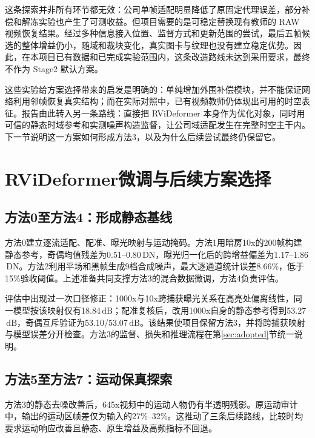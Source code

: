 \documentclass[11pt,a4paper,UTF8,fontset=fandol]{ctexart}
\newcommand{\dn}{\ensuremath{\,\mathrm{DN}}}
\newcommand{\db}{\ensuremath{\,\mathrm{dB}}}
\begin{document}
这条探索并非所有环节都无效：公司单帧适配明显降低了原固定代理误差，部分补偿和解冻实验也产生了可测收益。但项目需要的是可稳定替换现有教师的 RAW 视频恢复结果。经过多种信息接入位置、监督方式和更新范围的尝试，最后五帧候选的整体增益仍小，随域和裁块变化，真实图卡与纹理也没有建立稳定优势。因此，在本项目已有数据和已完成实验范围内，这条改造路线未达到采用要求，最终不作为 Stage2 默认方案。

这些实验给方案选择带来的启发是明确的：单纯增加外围补偿模块，并不能保证网络利用邻帧恢复真实结构；而在实际对照中，已有视频教师仍体现出可用的时空表征。报告由此转入另一条路线：直接把 RViDeformer 本身作为优化对象，同时用可信的静态时域参考和实测噪声构造监督，让公司域适配发生在完整时空主干内。下一节说明这一方案如何形成方法3，以及为什么后续尝试最终仍保留它。

\section{RViDeformer微调与后续方案选择}
\label{sec:exploration}

\subsection{方法0至方法4：形成静态基线}

方法0建立逐流适配、配准、曝光映射与运动掩码。方法1用暗房10x的200帧构建静态参考，奇偶均值残差为0.51--0.80\dn，曝光归一化后的跨增益偏差为1.17--1.86\dn。方法2利用平场和黑帧生成9档合成噪声，最大逐通道统计误差8.66\%，低于15\%验收阈值。上述准备共同支撑方法3的混合数据微调，方法4负责评估。

评估中出现过一次口径修正：1000x与10x跨捕获曝光关系在高亮处偏离线性，同一模型按该映射仅有18.84\db；配准复核后，改用1000x自身的静态参考得到53.27\db，奇偶互斥验证为53.10/53.07\db。该结果使项目保留方法3，并将跨捕获映射与模型误差分开检查。方法3的监督、损失和推理流程在第\ref{sec:adopted}节统一说明。

\subsection{方法5至方法7：运动保真探索}

方法3的静态去噪改善后，645x视频中的运动人物仍有半透明残影。原运动审计中，输出的运动区帧差仅为输入的27\%--32\%。这推动了三条后续路线，比较时均要求运动响应改善且静态、原生增益及高频指标不回退。
\end{document}
